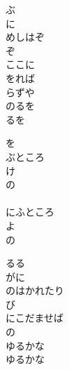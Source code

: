 \documentclass[10pt,b5j]{tarticle} %
\begin{document}
\vspace{1.5em} %
\newcommand{\linespace}{0.5em} %
\newcommand{\blocksize}{0.5\hsize} %
\begin{enumerate} %
    \begin{minipage}[c]{\blocksize}
    
        \vspace{\linespace}
        \item
        ぶ\\
        に\\
        めしはぞ\\
        ぞ\\
        ここに\\
        をれば\\
        らずや\\
        のるを\\
        るを
        
        \vspace{\linespace}
        \item
        を\\
        ぶところ\\
        け\\
        の\\
        \\
        にふところ\\
        よ\\
        の\\
        
        \vspace{\linespace}
        \item
        るる\\
        がに\\
        のはかれたり\\
        び\\
        にこだませば\\
        の\\
        ゆるかな\\
        ゆるかな
    
    \end{minipage}
\end{enumerate} %
\end{document}
